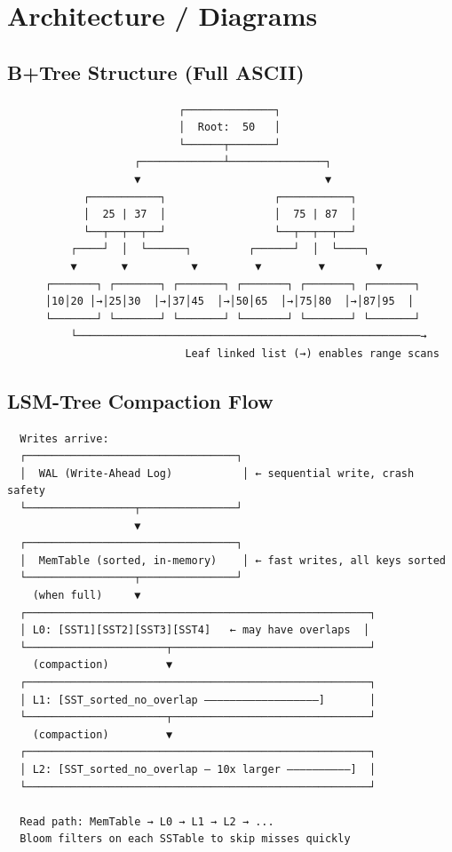 \documentclass[11pt]{article}
\begin{document}
\section{Architecture / Diagrams}\label{architecture--diagrams}

\subsection{B+Tree Structure (Full ASCII)}\label{btree-structure-full-ascii}

\setcodelang{}

\begin{verbatim}
                           ┌──────────────┐
                           │  Root:  50   │
                           └──────┬───────┘
                    ┌─────────────┴───────────────┐
                    ▼                             ▼
            ┌───────────┐                 ┌───────────┐
            │  25 | 37  │                 │  75 | 87  │
            └──┬──┬──┬──┘                 └──┬──┬──┬──┘
          ┌────┘  │  └──────┐         ┌──────┘  │  └────┐
          ▼       ▼          ▼         ▼         ▼        ▼
      ┌───────┐ ┌───────┐ ┌───────┐ ┌───────┐ ┌───────┐ ┌───────┐
      │10│20 │→│25│30  │→│37│45  │→│50│65  │→│75│80  │→│87│95  │
      └───────┘ └───────┘ └───────┘ └───────┘ └───────┘ └───────┘
          └──────────────────────────────────────────────────────→
                            Leaf linked list (→) enables range scans
\end{verbatim}

\subsection{LSM-Tree Compaction Flow}\label{lsm-tree-compaction-flow}

\setcodelang{}

\begin{verbatim}
  Writes arrive:
  ┌─────────────────────────────────┐
  │  WAL (Write-Ahead Log)           │ ← sequential write, crash safety
  └─────────────────┬───────────────┘
                    ▼
  ┌─────────────────────────────────┐
  │  MemTable (sorted, in-memory)    │ ← fast writes, all keys sorted
  └─────────────────┬───────────────┘
    (when full)     ▼
  ┌──────────────────────────────────────────────────────┐
  │ L0: [SST1][SST2][SST3][SST4]   ← may have overlaps  │
  └──────────────────────┬───────────────────────────────┘
    (compaction)         ▼
  ┌──────────────────────────────────────────────────────┐
  │ L1: [SST_sorted_no_overlap ——————————————————]       │
  └──────────────────────┬───────────────────────────────┘
    (compaction)         ▼
  ┌──────────────────────────────────────────────────────┐
  │ L2: [SST_sorted_no_overlap — 10x larger ——————————]  │
  └──────────────────────────────────────────────────────┘
  
  Read path: MemTable → L0 → L1 → L2 → ...
  Bloom filters on each SSTable to skip misses quickly
\end{verbatim}
\end{document}
